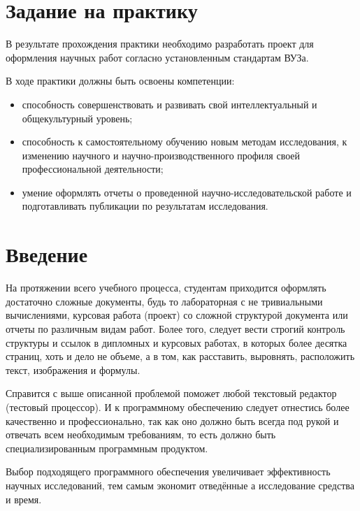 \section{Задание на практику}
	В результате прохождения практики необходимо разработать проект для оформления
		научных работ согласно установленным стандартам ВУЗа.

	В ходе практики должны быть освоены компетенции:
		\begin{itemize}
			\item способность совершенствовать и развивать свой интеллектуальный и общекультурный уровень;
			\item способность к самостоятельному обучению новым методам исследования, к изменению научного и научно-производственного профиля своей профессиональной деятельности;
			\item умение оформлять отчеты о проведенной научно-исследовательской работе и подготавливать публикации по результатам исследования.
		\end{itemize}

\newpage
\section{Введение}
	На протяжении всего учебного процесса, студентам приходится оформлять достаточно сложные документы,
	будь то лабораторная с не тривиальными вычислениями, курсовая работа (проект) со сложной структурой документа
	или отчеты по различным видам работ. 
	Более того, следует вести строгий контроль структуры и ссылок в дипломных и курсовых работах, в которых более десятка страниц, хоть и дело не объеме, а в том,
	как расставить, выровнять, расположить текст, изображения и формулы.

	Справится с выше описанной проблемой поможет любой текстовый редактор (тестовый процессор). И к программному обеспечению следует отнестись более качественно и профессионально,
	так как оно должно быть всегда под рукой и отвечать всем необходимым требованиям, то есть должно быть специализированным программным продуктом.

	Выбор подходящего программного обеспечения увеличивает эффективность научных исследований, тем самым экономит отведённые а исследование средства и время.

